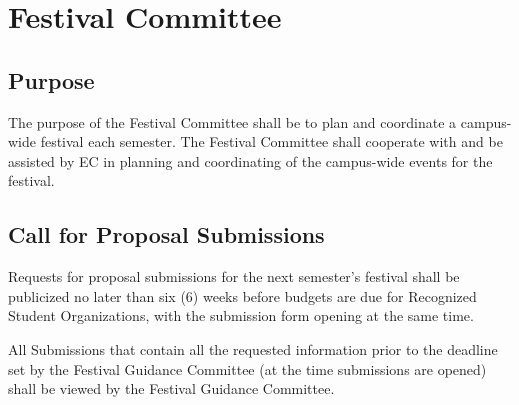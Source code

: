 \documentclass[12pt]{scrreprt}
\begin{document}
\section{Festival Committee}

\subsection{Purpose}
The purpose of the Festival Committee shall be to plan and coordinate a 
campus-wide festival each semester. The Festival Committee shall cooperate 
with and be assisted by EC in planning and coordinating of the campus-wide 
events for the festival.

\subsection{Call for Proposal Submissions}
Requests for proposal submissions for the next semester's festival shall be publicized no later than six (6) weeks before budgets are due for Recognized Student Organizations, with the submission form opening at the same time.

All Submissions that contain all the requested information prior to the deadline set by the Festival Guidance Committee (at the time submissions are opened) shall be viewed by the Festival Guidance Committee.
\end{document}
